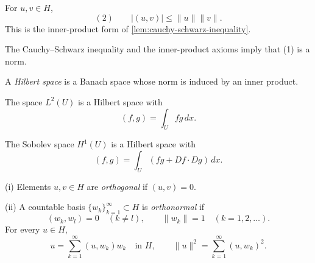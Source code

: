 \begin{lemma}
\label{lem:cauchy-schwarz-inequality-hilbert}

For $u,v\in H$,
\[
(2)\qquad |(u,v)|\leq\|u\|\|v\|.
\]
This is the inner-product form of \cref{lem:cauchy-schwarz-inequality}.
\end{lemma}

The Cauchy--Schwarz inequality and the inner-product axioms imply that (1) is a norm.

\begin{definition}
\label{def:hilbert-space}

A \textit{Hilbert space} is a Banach space whose norm is induced by an inner product.
\end{definition}

\begin{example}
\label{ex:l2-hilbert-space-example}

The space $L^2(U)$ is a Hilbert space with
\[
(f,g)=\int_Ufg\,dx.
\]
\end{example}

\begin{example}
\label{ex:h1-hilbert-space-example}

The Sobolev space $H^1(U)$ is a Hilbert space with
\[
(f,g)=\int_U(fg+Df\cdot Dg)\,dx.
\]
\end{example}

\begin{definition}
\label{def:orthogonal-orthonormal-basis}

(i) Elements $u,v\in H$ are \textit{orthogonal} if $(u,v)=0$.

(ii) A countable basis $\{w_k\}_{k=1}^\infty\subset H$ is \textit{orthonormal} if
\[
(w_k,w_l)=0\quad(k\ne l),
\qquad
\|w_k\|=1\quad(k=1,2,\ldots).
\]
For every $u\in H$,
\[
u=\sum_{k=1}^\infty(u,w_k)w_k
\quad\text{in }H,
\qquad
\|u\|^2=\sum_{k=1}^\infty(u,w_k)^2.
\]
\end{definition}


